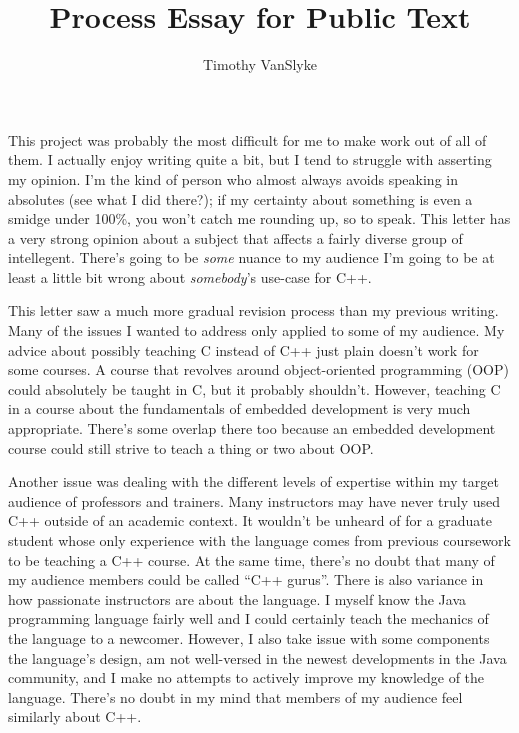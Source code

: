 \documentclass{article}
\title{Process Essay for Public Text}
\author{Timothy VanSlyke}
\begin{document}
\raggedright
\maketitle
This project was probably the most difficult for me to make work out of all of them.  I actually enjoy writing quite a bit, but I tend to struggle with asserting my opinion.  I'm the kind of person who almost always avoids speaking in absolutes (see what I did there?); if my certainty about something is even a smidge under 100\%, you won't catch me rounding up, so to speak.  This letter has a very strong opinion about a subject that affects a fairly diverse group of intellegent.  There's going to be \emph{some} nuance to my audience I'm going to be at least a little bit wrong about \emph{somebody}'s use-case for C++.





This letter saw a much more gradual revision process than my previous writing.  Many of the issues I wanted to address only applied to some of my audience.  My advice about possibly teaching C instead of C++ just plain doesn't work for some courses.  A course that revolves around object-oriented programming (OOP) could absolutely be taught in C, but it probably shouldn't.  However, teaching C in a course about the fundamentals of embedded development is very much appropriate.  There's some overlap there too because an embedded development course could still strive to teach a thing or two about OOP.


Another issue was dealing with the different levels of expertise within my target audience of professors and trainers.  Many instructors may have never truly used C++ outside of an academic context. It wouldn't be unheard of for a graduate student whose only experience with the language comes from previous coursework to be teaching a C++ course.  At the same time, there's no doubt that many of my audience members could be called ``C++ gurus''.  There is also variance in how passionate instructors are about the language.  I myself know the Java programming language fairly well and I could certainly teach the mechanics of the language to a newcomer.  However, I also take issue with some components the language's design, am not well-versed in the newest developments in the Java community, and I make no attempts to actively improve my knowledge of the language.  There's no doubt in my mind that members of my audience feel similarly about C++.
\end{document}
